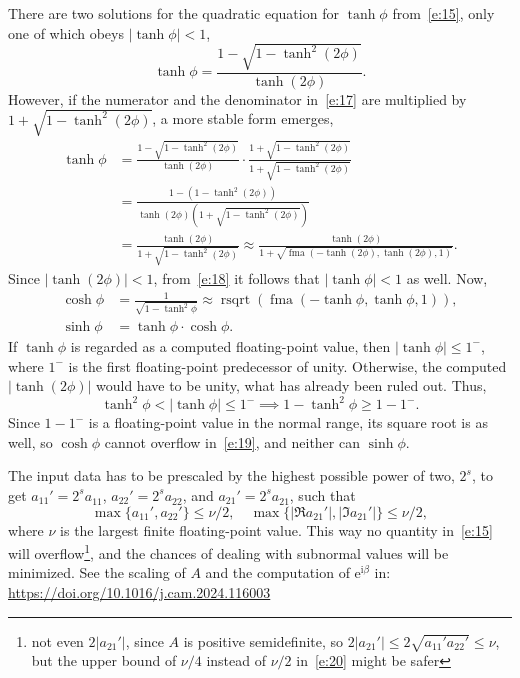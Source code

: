 \documentclass[a4paper,12pt,twoside]{article}
\begin{document}
There are two solutions for the quadratic equation for $\tanh\phi$
from~\eqref{e:15}, only one of which obeys $|\tanh\phi|<1$,
\begin{equation}
  \tanh\phi=\frac{1-\sqrt{1-\tanh^2(2\phi)}}{\tanh(2\phi)}.
  \label{e:17}
\end{equation}
However, if the numerator and the denominator in~\eqref{e:17} are
multiplied by $1+\sqrt{1-\tanh^2(2\phi)}$, a more stable form emerges,
\begin{equation}
  \begin{aligned}
    \tanh\phi&=\frac{1-\sqrt{1-\tanh^2(2\phi)}}{\tanh(2\phi)}\cdot\frac{1+\sqrt{1-\tanh^2(2\phi)}}{1+\sqrt{1-\tanh^2(2\phi)}}\\
    &=\frac{1-(1-\tanh^2(2\phi))}{\tanh(2\phi)\left(1+\sqrt{1-\tanh^2(2\phi)}\right)}\\
    &=\frac{\tanh(2\phi)}{1+\sqrt{1-\tanh^2(2\phi)}}\approx\frac{\tanh(2\phi)}{1+\sqrt{\mathop{\mathrm{fma}}(-\tanh(2\phi),\tanh(2\phi),1)}}.
  \end{aligned}
  \label{e:18}
\end{equation}
Since $|\tanh(2\phi)|<1$, from~\eqref{e:18} it follows that
$|\tanh\phi|<1$ as well.  Now,
\begin{equation}
  \begin{aligned}
    \cosh\phi&=\frac{1}{\sqrt{1-\tanh^2\phi}}\approx\mathop{\mathrm{rsqrt}}(\mathop{\mathrm{fma}}(-\tanh\phi,\tanh\phi,1)),\\
    \sinh\phi&=\tanh\phi\cdot\cosh\phi.
  \end{aligned}
  \label{e:19}
\end{equation}
If $\tanh\phi$ is regarded as a computed floating-point value, then
$|\tanh\phi|\le 1^-$, where $1^-$ is the first floating-point
predecessor of unity.  Otherwise, the computed $|\tanh(2\phi)|$ would
have to be unity, what has already been ruled out.  Thus,
\begin{displaymath}
  \tanh^2\phi<|\tanh\phi|\le 1^-\implies 1-\tanh^2\phi\ge 1-1^-.
\end{displaymath}
Since $1-1^-$ is a floating-point value in the normal range, its
square root is as well, so $\cosh\phi$ cannot overflow
in~\eqref{e:19}, and neither can $\sinh\phi$.

The input data has to be prescaled by the highest possible power of
two, $2^s$, to get $a_{11}'=2^s a_{11}^{}$, $a_{22}'=2^s a_{22}^{}$,
and $a_{21}'=2^s a_{21}^{}$, such that
\begin{equation}
  \max\{a_{11}',a_{22}'\}\le\nu/2,\quad
  \max\{|\Re{a_{21}'}|,|\Im{a_{21}'}|\}\le\nu/2,
  \label{e:20}
\end{equation}
where $\nu$ is the largest finite floating-point value.  This way no
quantity in~\eqref{e:15} will overflow\footnote{not even $2|a_{21}'|$,
since $A$ is positive semidefinite, so
$2|a_{21}'|\le 2\sqrt{a_{11}'a_{22}'}\le\nu$, but the upper bound of
$\nu/4$ instead of $\nu/2$ in~\eqref{e:20} might be safer}, and the
chances of dealing with subnormal values will be minimized.  See the
scaling of $A$ and the computation of $\mathrm{e}^{\mathrm{i}\beta}$
in:\\\url{https://doi.org/10.1016/j.cam.2024.116003}
\end{document}

